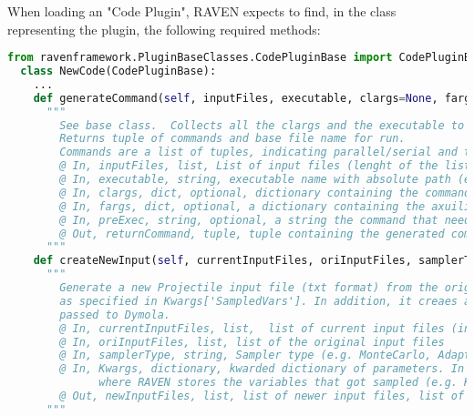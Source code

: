 When loading an "Code Plugin", RAVEN expects to find, in the class
representing the plugin, the following required methods:
\begin{lstlisting}[language=python, basicstyle=\scriptsize\ttfamily, breaklines=True, columns=fullflexible]
  from ravenframework.PluginBaseClasses.CodePluginBase import CodePluginBase
  class NewCode(CodePluginBase):
    ...
    def generateCommand(self, inputFiles, executable, clargs=None, fargs=None, preExec=None):
      """
        See base class.  Collects all the clargs and the executable to produce the command-line call.
        Returns tuple of commands and base file name for run.
        Commands are a list of tuples, indicating parallel/serial and the execution command to use.
        @ In, inputFiles, list, List of input files (lenght of the list depends on the number of inputs have been added in the Step is running this code)
        @ In, executable, string, executable name with absolute path (e.g. /home/path_to_executable/code.exe)
        @ In, clargs, dict, optional, dictionary containing the command-line flags the user can specify in the input (e.g. under the node < Code >< clargstype =0 input0arg =0 i0extension =0 .inp0/ >< /Code >)
        @ In, fargs, dict, optional, a dictionary containing the axuiliary input file variables the user can specify in the input (e.g. under the node < Code >< clargstype =0 input0arg =0 aux0extension =0 .aux0/ >< /Code >)
        @ In, preExec, string, optional, a string the command that needs to be pre-executed before the actual command here defined
        @ Out, returnCommand, tuple, tuple containing the generated command. returnCommand[0] is the command to run the code (string), returnCommand[1] is the name of the output root
      """
    def createNewInput(self, currentInputFiles, oriInputFiles, samplerType, **Kwargs):
      """
        Generate a new Projectile input file (txt format) from the original, changing parameters
        as specified in Kwargs['SampledVars']. In addition, it creaes an additional input file including the vector data to be
        passed to Dymola.
        @ In, currentInputFiles, list,  list of current input files (input files from last this method call)
        @ In, oriInputFiles, list, list of the original input files
        @ In, samplerType, string, Sampler type (e.g. MonteCarlo, Adaptive, etc. see manual Samplers section)
        @ In, Kwargs, dictionary, kwarded dictionary of parameters. In this dictionary there is another dictionary called "SampledVars"
              where RAVEN stores the variables that got sampled (e.g. Kwargs['SampledVars'] => {'var1':10,'var2':40})
        @ Out, newInputFiles, list, list of newer input files, list of the new input files (modified and not)
      """

\end{lstlisting}

